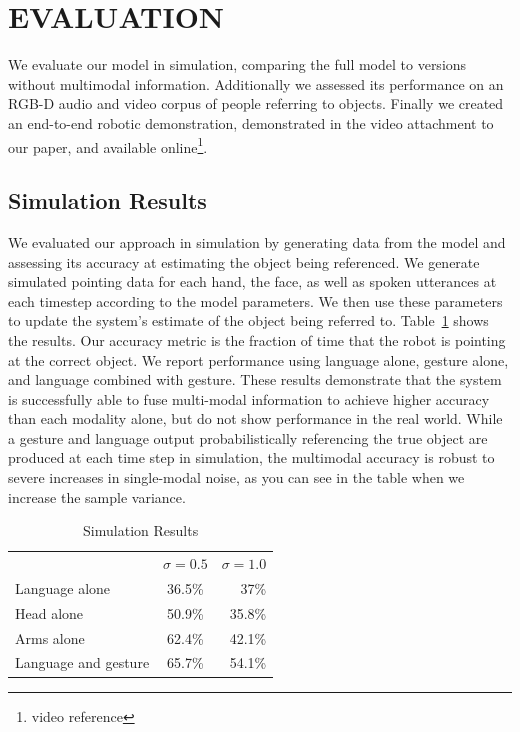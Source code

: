 \documentclass[letterpaper, 10 pt, conference]{ieeeconf}
\begin{document}
\section{EVALUATION}

We evaluate our model in simulation, comparing the full model to
versions without multimodal information.  Additionally we assessed its
performance on an RGB-D audio and video corpus of people referring to
objects.  Finally we created an end-to-end robotic demonstration,
demonstrated in the video attachment to our paper, and available
online\footnote{video reference}. 

\subsection{Simulation Results}

We evaluated our approach in simulation by generating data from the
model and assessing its accuracy at estimating the object being
referenced.  We generate simulated pointing data for each hand, the
face, as well as spoken utterances at each timestep according to the
model parameters.  We then use these parameters to update the system's
estimate of the object being referred to.
Table~\ref{table:sim_results} shows the results.  Our accuracy metric
is the fraction of time that the robot is pointing at the correct
object.  We report performance using language alone, gesture alone,
and language combined with gesture.  These results demonstrate that
the system is successfully able to fuse multi-modal information to
achieve higher accuracy than each modality alone, but do not show
performance in the real world.  While a gesture and language output
probabilistically referencing the true object are produced at each
time step in simulation, the multimodal accuracy is robust to severe
increases in single-modal noise, as you can see in the table when we increase the sample variance. 

\begin{table}
\centering
\caption{Simulation Results\label{table:sim_results}}
\begin{tabular}{lcr}
& $\sigma = 0.5$ & $\sigma = 1.0$\\
Language alone &  36.5\% & 37\%\\
Head alone & 50.9\% & 35.8\%\\
Arms alone & 62.4\% & 42.1\%\\
Language and gesture &  65.7\% & 54.1\%
\end{tabular}

\end{table}
\end{document}
